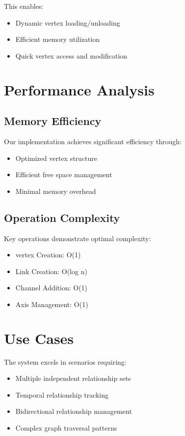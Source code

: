 This enables:
\begin{itemize}
    \item Dynamic vertex loading/unloading
    \item Efficient memory utilization
    \item Quick vertex access and modification
\end{itemize}

\section{Performance Analysis}\label{Sec:Performance}
\subsection{Memory Efficiency}
Our implementation achieves significant efficiency through:
\begin{itemize}
    \item Optimized vertex structure
    \item Efficient free space management
    \item Minimal memory overhead
\end{itemize}

\subsection{Operation Complexity}
Key operations demonstrate optimal complexity:
\begin{itemize}
    \item vertex Creation: O(1)
    \item Link Creation: O(log n)
    \item Channel Addition: O(1)
    \item Axis Management: O(1)
\end{itemize}

\section{Use Cases}\label{Sec:UseCases}
The system excels in scenarios requiring:
\begin{itemize}
    \item Multiple independent relationship sets
    \item Temporal relationship tracking
    \item Bidirectional relationship management
    \item Complex graph traversal patterns
\end{itemize}

